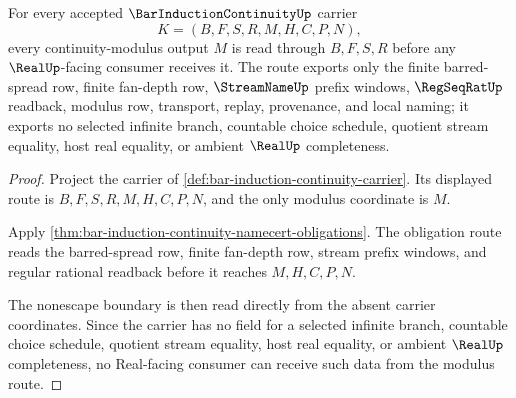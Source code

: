 \begin{theorem}
\label{thm:bar-induction-continuity-prefix-modulus-nonescape}
For every accepted $\BarInductionContinuityUp$ carrier
$$
K=(B,F,S,R,M,H,C,P,N),
$$
every continuity-modulus output $M$ is read through $B,F,S,R$ before any $\RealUp$-facing consumer receives it. The route exports only the finite barred-spread row, finite fan-depth row, $\StreamNameUp$ prefix windows, $\RegSeqRatUp$ readback, modulus row, transport, replay, provenance, and local naming; it exports no selected infinite branch, countable choice schedule, quotient stream equality, host real equality, or ambient $\RealUp$ completeness.
\end{theorem}
\begin{proof}
Project the carrier of \autoref{def:bar-induction-continuity-carrier}. Its displayed route is $B,F,S,R,M,H,C,P,N$, and the only modulus coordinate is $M$.

Apply \autoref{thm:bar-induction-continuity-namecert-obligations}. The obligation route reads the barred-spread row, finite fan-depth row, stream prefix windows, and regular rational readback before it reaches $M,H,C,P,N$.

The nonescape boundary is then read directly from the absent carrier coordinates. Since the carrier has no field for a selected infinite branch, countable choice schedule, quotient stream equality, host real equality, or ambient $\RealUp$ completeness, no Real-facing consumer can receive such data from the modulus route.
\end{proof}


\begin{closurestatus}{\BarInductionContinuityUp}
  \theoryclosure{\seedClosure}
  \formalstatus{\unformalizedV}
\end{closurestatus}
